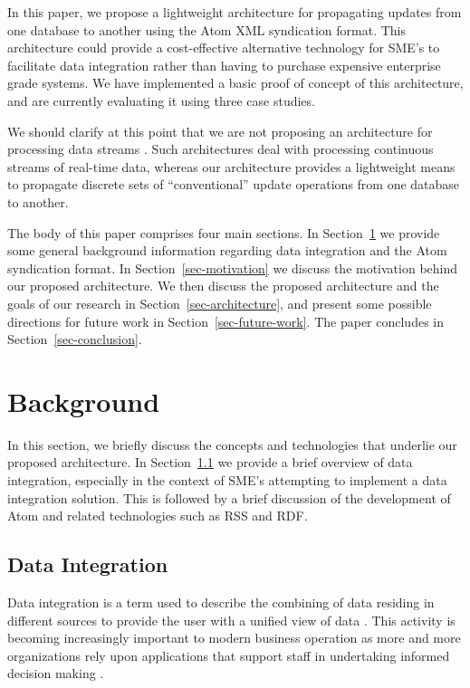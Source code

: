 \documentclass{CRPITStyle}
\begin{document}
In this paper, we propose a lightweight architecture for propagating
updates from one database to another using the Atom XML syndication
format. This architecture could provide a cost-effective alternative
technology for SME's to facilitate data integration rather than having
to purchase expensive enterprise grade systems. We have implemented a
basic proof of concept of this architecture, and are currently
evaluating it using three case studies.

We should clarify at this point that we are not proposing an
architecture for processing data streams \cite{Babc-B-2002-Streams}.
Such architectures deal with processing continuous streams of real-time
data, whereas our architecture provides a lightweight means to propagate
discrete sets of ``conventional'' update operations from one database to
another.

The body of this paper comprises four main sections. In
Section~\ref{sec-background} we provide some general background
information regarding data integration and the Atom syndication format.
In Section~\ref{sec-motivation} we discuss the motivation behind our
proposed architecture. We then discuss the proposed architecture and the
goals of our research in Section~\ref{sec-architecture}, and present
some possible directions for future work in
Section~\ref{sec-future-work}. The paper concludes in
Section~\ref{sec-conclusion}.


\section{Background}
\label{sec-background}

In this section, we briefly discuss the concepts and technologies that
underlie our proposed architecture. In
Section~\ref{sec-data-integration} we provide a brief overview of data
integration, especially in the context of SME's attempting to implement
a data integration solution. This is followed by a brief discussion of
the development of Atom and related technologies such as RSS and RDF.


\subsection{Data Integration}
\label{sec-data-integration}

Data integration is a term used to describe the combining of data
residing in different sources to provide the user with a unified view of
data \cite{Bati-C-1986,Yu-C-2004-SIGMOD}. This activity is becoming
increasingly important to modern business operation as more and more
organizations rely upon applications that support staff in undertaking
informed decision making \cite{Calv-D-1998-CoopIS,Yu-C-2004-SIGMOD}.
\end{document}
